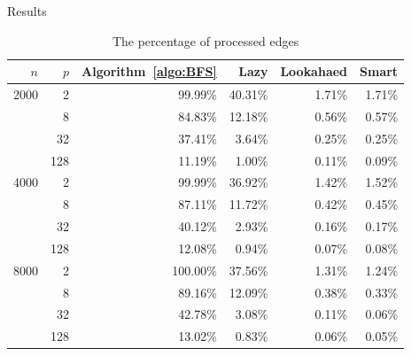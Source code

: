 \documentclass{beamer}
\begin{document}
\begin{frame}{Results}
\begin{table}[ht]
	\center
	\begin{tabular}{rr||r||rrr}
$n$		&	$p$	& Algorithm~\ref{algo:BFS} 	& Lazy		& Lookahaed & Smart \\\hline\hline
2000	& 2		& 99.99\%					& 40.31\%	& 1.71\%	& 1.71\%\\
		& 8		& 84.83\%					& 12.18\%	& 0.56\%	& 0.57\%\\
		& 32	& 37.41\%					& 3.64\%	& 0.25\%	& 0.25\%\\
		& 128	& 11.19\%					& 1.00\%	& 0.11\%	& 0.09\%\\\hline
4000	& 2		& 99.99\%					& 36.92\%	& 1.42\%	& 1.52\%\\
		& 8		& 87.11\%					& 11.72\%	& 0.42\%	& 0.45\%\\
		& 32	& 40.12\%					& 2.93\%	& 0.16\%	& 0.17\%\\
		& 128	& 12.08\%					& 0.94\%	& 0.07\%	& 0.08\%\\\hline
8000	& 2		& 100.00\%					& 37.56\%	& 1.31\%	& 1.24\%\\
		& 8		& 89.16\%					& 12.09\%	& 0.38\%	& 0.33\%\\
		& 32	& 42.78\%					& 3.08\%	& 0.11\%	& 0.06\%\\
		& 128	& 13.02\%					& 0.83\%	& 0.06\%	& 0.05\%
	\end{tabular}
	\caption{The percentage of processed edges}
	\label{table:edge-percent}
\end{table}
\end{frame}
\end{document}
